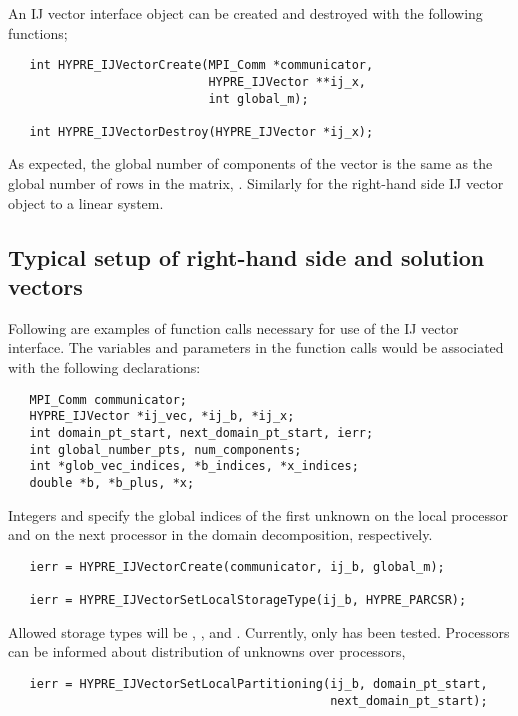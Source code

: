 An IJ vector interface object can be created and destroyed with
the following functions;
\begin{verbatim}
   int HYPRE_IJVectorCreate(MPI_Comm *communicator,
                            HYPRE_IJVector **ij_x,
                            int global_m);

   int HYPRE_IJVectorDestroy(HYPRE_IJVector *ij_x);
\end{verbatim}

\noindent As expected, the global number of components of the
vector is the same as the global number of rows in the matrix,
.
Similarly for the right-hand side IJ vector object to a linear
system.

\subsection{Typical setup of right-hand side and solution vectors}

Following are examples of function calls necessary for use of the
IJ vector interface.  The variables and parameters in the
function calls would be associated with the following declarations:

\begin{verbatim}
   MPI_Comm communicator;
   HYPRE_IJVector *ij_vec, *ij_b, *ij_x;
   int domain_pt_start, next_domain_pt_start, ierr;
   int global_number_pts, num_components;
   int *glob_vec_indices, *b_indices, *x_indices;
   double *b, *b_plus, *x;
\end{verbatim}

\noindent Integers  and 
specify the global indices of the first unknown on the local processor
and on the next processor in the domain decomposition, respectively.

\begin{verbatim}
   ierr = HYPRE_IJVectorCreate(communicator, ij_b, global_m);

   ierr = HYPRE_IJVectorSetLocalStorageType(ij_b, HYPRE_PARCSR);
\end{verbatim}

\noindent Allowed storage types will be ,
, and .  Currently, only
 has been tested.  Processors can be informed
about distribution of unknowns over processors,

\begin{verbatim}
   ierr = HYPRE_IJVectorSetLocalPartitioning(ij_b, domain_pt_start,
                                             next_domain_pt_start);
\end{verbatim}

